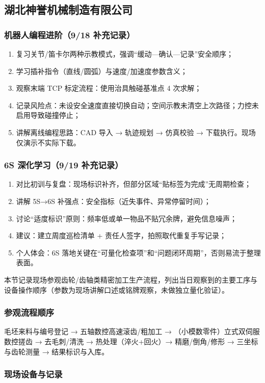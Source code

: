 \subsection{湖北神誉机械制造有限公司}
\subsubsection{机器人编程进阶（9/18 补充记录）}
\begin{enumerate}[label=\arabic*.]
  \item 复习关节/笛卡尔两种示教模式，强调“缓动—确认—记录”安全顺序；
  \item 学习插补指令（直线/圆弧）与速度/加速度参数含义；
  \item 观察末端 TCP 标定流程：使用治具触碰基准点 4 次求解；
  \item 记录风险点：未设安全速度直接切换自动；空间示教未清空上次路径；力控未启用导致碰撞停止；
  \item 讲解离线编程思路：CAD 导入 → 轨迹规划 → 仿真校验 → 下载执行。现场仅演示不实际下载。 
\end{enumerate}
\subsubsection{6S 深化学习（9/19 补充记录）}
\begin{enumerate}[label=\arabic*.]
  \item 对比初训与复盘：现场标识补齐，但部分区域“贴标签为完成”无周期检查；
  \item 讲解 5S→6S 补强点：安全指标（近失事件、异常停留时间）；
  \item 讨论“适度标识”原则：频率低或单一物品不贴冗余牌，避免信息噪声；
  \item 建议：建立周度巡检清单 + 责任人签字，拍照取代重复手写记录；
  \item 个人体会：6S 落地关键在“可量化检查项”和“问题闭环周期”，否则易流于整理表面。 
\end{enumerate}
本节记录现场参观齿轮/齿轴类精密加工生产流程，列出当日观察到的主要工序与设备操作顺序（参数为现场讲解口述或铭牌观察，未做独立量化验证）。

\subsubsection{参观流程顺序}
毛坯来料与编号登记 → 五轴数控高速滚齿/粗加工 → （小模数零件）立式双伺服数控搓齿 → 去毛刺/清洗 → 热处理（淬火+回火）→ 精磨/倒角/修形 → 三坐标与齿轮测量 → 结果标识与入库。

\subsubsection{现场设备与记录}
